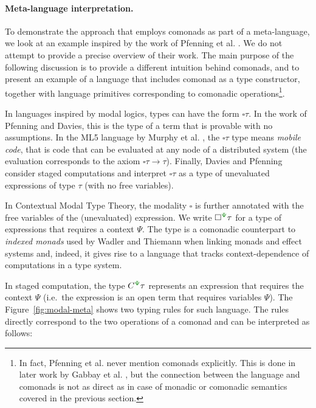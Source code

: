 
\paragraph{Meta-language interpretation.} To demonstrate the approach that employs comonads
as part of a meta-language, we look at an example inspired by the work of Pfenning et al.
\cite{logic-modal-reconstruction,logic-cmtt}. We do not attempt to provide a precise overview of
their work. The main purpose of the following discussion is to provide a different intuition behind
comonads, and to present an example of a language that includes comonad as a type constructor,
together with language primitives corresponding to comonadic operations\footnote{In fact,
Pfenning et al. never mention comonads explicitly. This is done in later work by Gabbay et al.
\cite{logic-cmtt-semantics},  but the connection between the language and comonads
is not as direct as in case of monadic or comonadic semantics covered in the previous section.}.

In languages inspired by modal logics, types can have the form $\square \tau$. In the work of
Pfenning and Davies, this is the type of a term that is provable with no assumptions. In the
ML5 language by Murphy et al. \cite{app-distributed-ml5,logic-distributed-calculus}, the
$\square \tau$ type means \emph{mobile code}, that is code that can be evaluated at any node of a
distributed system (the evaluation corresponds to the axiom $\square \tau \rightarrow \tau$).
Finally, Davies and Pfenning \cite{logic-modal-staged} consider staged computations and interpret
$\square \tau$ as a type of unevaluated expressions of type $\tau$ (with no free variables).

In Contextual Modal Type Theory, the modality $\square$ is further annotated with the free variables
of the (unevaluated) expression. We write $\square^{\cclrd{\Psi}} \tau$ for a type of expressions
that requires a context $\Psi$. The type is a comonadic counterpart to \emph{indexed monads} used by
Wadler and Thiemann when linking monads and effect systems and, indeed, it gives rise to a language
that tracks context-dependence of computations in a type system.

In staged computation, the type $\ctyp{\cclrd{\Psi}}{\tau}$ represents an expression
that requires the context $\Psi$ (i.e.~the expression is an open term that requires variables $\Psi$).
The Figure~\ref{fig:modal-meta} shows two typing rules for such language. The rules directly
correspond to the two operations of a comonad and can be interpreted as follows:

